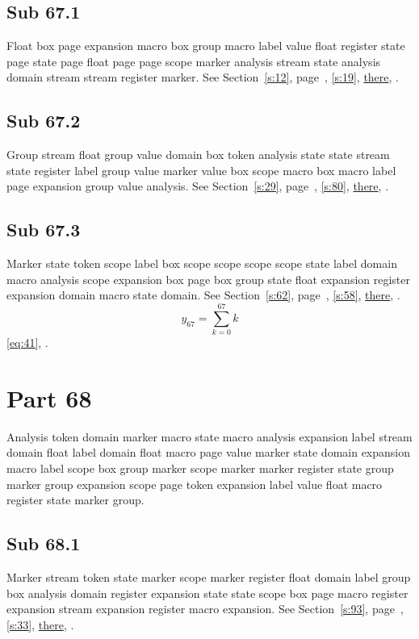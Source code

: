 \documentclass[11pt]{article}
\begin{document}
\subsection{Sub 67.1}\label{ss:67.1} Float box page expansion macro box group macro label value float register state page state page float page page scope marker analysis stream state analysis domain stream stream register marker. See Section~\ref{s:12}, page~\pageref{ss:40.3}, \cref{s:19}, \hyperref[s:73]{there}, \cite{k40,k53}.
\subsection{Sub 67.2}\label{ss:67.2} Group stream float group value domain box token analysis state state stream state register label group value marker value box scope macro box macro label page expansion group value analysis. See Section~\ref{s:29}, page~\pageref{ss:22.1}, \cref{s:80}, \hyperref[s:29]{there}, \cite{k2,k80}.
\subsection{Sub 67.3}\label{ss:67.3} Marker state token scope label box scope scope scope scope state label domain macro analysis scope expansion box page box group state float expansion register expansion domain macro state domain. See Section~\ref{s:62}, page~\pageref{ss:97.3}, \cref{s:58}, \hyperref[s:15]{there}, \cite{k42,k5}.
\begin{equation}y_{67}=\sum_{k=0}^{67}k\label{eq:67}\end{equation} \eqref{eq:41}, .
\section{Part 68}\label{s:68}
Analysis token domain marker macro state macro analysis expansion label stream domain float label domain float macro page value marker state domain expansion macro label scope box group marker scope marker marker register state group marker group expansion scope page token expansion label value float macro register state marker group.
\subsection{Sub 68.1}\label{ss:68.1} Marker stream token state marker scope marker register float domain label group box analysis domain register expansion state state scope box page macro register expansion stream expansion register macro expansion. See Section~\ref{s:93}, page~\pageref{ss:97.3}, \cref{s:33}, \hyperref[s:7]{there}, \cite{k75,k60}.
\end{document}
